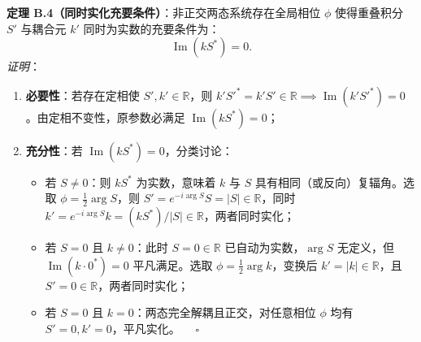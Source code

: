 \textbf{定理 B.4（同时实化充要条件）}：非正交两态系统存在全局相位 $\phi$ 使得重叠积分 $S'$ 与耦合元 $k'$ 同时为实数的充要条件为：
\begin{equation}\label{eq:appB-realifiability-condition}
\operatorname{Im}(k S^*) = 0.
\end{equation}
\textit{证明}：
\begin{enumerate}
\item \textbf{必要性}：若存在定相使 $S', k' \in \mathbb{R}$，则 $k' S'^* = k' S' \in \mathbb{R} \implies \operatorname{Im}(k' S'^*) = 0$。由定相不变性，原参数必满足 $\operatorname{Im}(k S^*) = 0$；
\item \textbf{充分性}：若 $\operatorname{Im}(k S^*) = 0$，分类讨论：
  \begin{itemize}
  \item 若 $S \ne 0$：则 $k S^*$ 为实数，意味着 $k$ 与 $S$ 具有相同（或反向）复辐角。选取 $\phi = \frac{1}{2} \arg S$，则 $S' = e^{-i \arg S} S = |S| \in \mathbb{R}$，同时 $k' = e^{-i \arg S} k = (k S^*) / |S| \in \mathbb{R}$，两者同时实化；
  \item 若 $S = 0$ 且 $k \ne 0$：此时 $S = 0 \in \mathbb{R}$ 已自动为实数，$\arg S$ 无定义，但 $\operatorname{Im}(k \cdot 0^*) = 0$ 平凡满足。选取 $\phi = \frac{1}{2} \arg k$，变换后 $k' = |k| \in \mathbb{R}$，且 $S' = 0 \in \mathbb{R}$，两者同时实化；
  \item 若 $S = 0$ 且 $k = 0$：两态完全解耦且正交，对任意相位 $\phi$ 均有 $S' = 0, k' = 0$，平凡实化。 $\quad \square$
  \end{itemize}
\end{enumerate}

